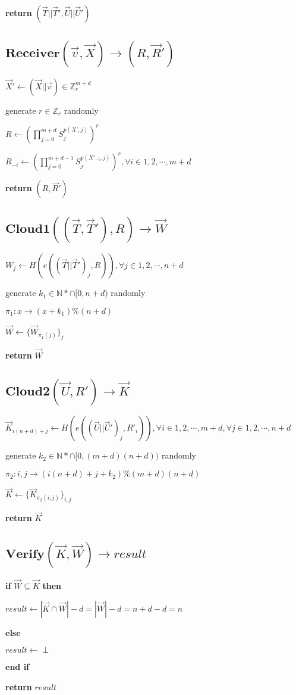 \documentclass[a4paper]{article}
\begin{document}
\textbf{return} $(\vec{T} || \vec{T}', \vec{U} || \vec{U}')$

\subsection{$\textbf{Receiver}(\vec{v}, \vec{X}) \rightarrow (R, \vec{R}')$}

$\vec{X}' \gets (\vec{X} || \vec{v}) \in \mathbb{Z}_r^{m + d}$

generate $r \in \mathbb{Z}_r$ randomly

$R \gets \left(\prod\limits_{j = 0}^{m + d} S_j^{p(X', j)}\right)^r$

$R_{-i} \gets \left(\prod\limits_{j = 0}^{m + d - 1} S_j^{p(X'_{-i}, j)}\right)^r, \forall i \in {1, 2, \cdots, m + d}$

\textbf{return} $(R, \vec{R}')$

\subsection{$\textbf{Cloud1}((\vec{T}, \vec{T}'), R) \rightarrow \vec{W}$}

$W_j \gets H(e((\vec{T} || \vec{T}')_j, R)), \forall j \in {1, 2, \cdots, n + d}$

generate $k_1 \in \mathbb{N}* \cap [0, n + d)$ randomly

$\pi_1: x \rightarrow (x + k_1) \% (n + d)$

$\vec{W} \gets \{\vec{W}_{\pi_1(j)}\}_j$

\textbf{return} $\vec{W}$

\subsection{$\textbf{Cloud2}(\vec{U}, R') \rightarrow \vec{K}$}

$\vec{K}_{i(n + d) + j} \gets H(e((\vec{U} || \vec{U}')_j, R'_i)), \forall i \in {1, 2, \cdots, m + d}, \forall j \in {1, 2, \cdots, n + d}$

generate $k_2 \in \mathbb{N}* \cap [0, (m + d)(n + d))$ randomly

$\pi_2: i, j \rightarrow (i(n + d) + j + k_2) \% (m + d)(n + d)$

$\vec{K} \gets \{\vec{K}_{\pi_2(i, j)}\}_{i, j}$

\textbf{return} $\vec{K}$

\subsection{$\textbf{Verify}(\vec{K}, \vec{W}) \rightarrow \textit{result}$}

\textbf{if} $\vec{W} \subseteq \vec{K}$ \textbf{then}

	\quad$\textit{result} \gets |\vec{K} \cap \vec{W}| - d = |\vec{W}| - d = n + d - d = n$

\textbf{else}

	\quad$\textit{result} \gets \perp$

\textbf{end if}

\textbf{return} $\textit{result}$
\end{document}
